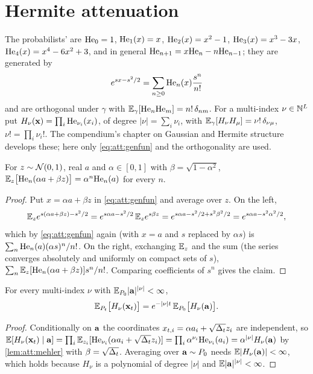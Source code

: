 \section{Hermite attenuation}
\label{sec:att:hermite}

The probabilists'  are $\mathrm{He}_{0}=1$, $\mathrm{He}_{1}(x)=x$,
$\mathrm{He}_{2}(x)=x^2-1$, $\mathrm{He}_{3}(x)=x^3-3x$, $\mathrm{He}_{4}(x)=x^4-6x^2+3$, and in general
$\mathrm{He}_{n+1}=x\mathrm{He}_{n}-n\mathrm{He}_{n-1}$; they are generated by
\begin{equation}
  e^{sx-s^2/2}=\sum_{n\ge0}\mathrm{He}_{n}(x)\frac{s^n}{n!}
  \label{eq:att:genfun}
\end{equation}
and are orthogonal under $\gamma$ with $\mathbb{E}_\gamma[\mathrm{He}_{n}\mathrm{He}_{m}]=n!\,\delta_{nm}$. For
a multi-index $\nu\in\mathbb{N}^{L}$ put $H_\nu(\mathbf{x})=\prod_i\mathrm{He}_{\nu_i}(x_i)$,
of degree $|\nu|=\sum_i\nu_i$, with $\mathbb{E}_\gamma[H_\nu H_\mu]=\nu!\,\delta_{\nu\mu}$,
$\nu!=\prod_i\nu_i!$. The compendium's chapter on Gaussian and Hermite structure
develops these; here only \cref{eq:att:genfun} and the orthogonality are used.

\begin{lemma}[Mehler]
\label{lem:att:mehler}
For $z\sim\mathcal{N}\!\left(0,1\right)$, real $a$ and $\alpha\in[0,1]$ with $\beta=\sqrt{1-\alpha^2}$,
$\mathbb{E}_z\bigl[\mathrm{He}_{n}(\alpha a+\beta z)\bigr]=\alpha^n\mathrm{He}_{n}(a)$ for every $n$.
\end{lemma}

\begin{proof}
Put $x=\alpha a+\beta z$ in \cref{eq:att:genfun} and average over $z$. On the left,
\[
  \mathbb{E}_z e^{s(\alpha a+\beta z)-s^2/2}=e^{s\alpha a-s^2/2}\,\mathbb{E}_ze^{s\beta z}=e^{s\alpha a-s^2/2+s^2\beta^2/2}=e^{s\alpha a-s^2\alpha^2/2},
\]
which by \cref{eq:att:genfun} again (with $x=a$ and $s$ replaced by $\alpha s$) is
$\sum_n\mathrm{He}_{n}(a)(\alpha s)^n/n!$. On the right, exchanging $\mathbb{E}_z$ and the sum (the
series converges absolutely and uniformly on compact sets of $s$),
$\sum_n\mathbb{E}_z[\mathrm{He}_{n}(\alpha a+\beta z)]s^n/n!$. Comparing coefficients of $s^n$ gives
the claim.
\end{proof}

\begin{theorem}
\label{thm:att:hermite}
For every multi-index $\nu$ with $\mathbb{E}_{P_0}|\mathbf{a}|^{|\nu|}<\infty$,
\[
  \mathbb{E}_{P_t}\bigl[H_\nu(\mathbf{x}_t)\bigr]=e^{-|\nu|t}\,\mathbb{E}_{P_0}\bigl[H_\nu(\mathbf{a})\bigr].
\]
\end{theorem}

\begin{proof}
Conditionally on $\mathbf{a}$ the coordinates $x_{t,i}=\alpha a_i+\sqrt{\Delta_t}z_i$ are
independent, so $\mathbb{E}[H_\nu(\mathbf{x}_t)\mid\mathbf{a}]=\prod_i\mathbb{E}_{z_i}[\mathrm{He}_{\nu_i}(\alpha a_i+\sqrt{\Delta_t}z_i)]=\prod_i\alpha^{\nu_i}\mathrm{He}_{\nu_i}(a_i)=\alpha^{|\nu|}H_\nu(\mathbf{a})$
by \cref{lem:att:mehler} with $\beta=\sqrt{\Delta_t}$. Averaging over $\mathbf{a}\sim P_0$ needs
$\mathbb{E}|H_\nu(\mathbf{a})|<\infty$, which holds because $H_\nu$ is a polynomial of degree $|\nu|$
and $\mathbb{E}|\mathbf{a}|^{|\nu|}<\infty$.
\end{proof}

